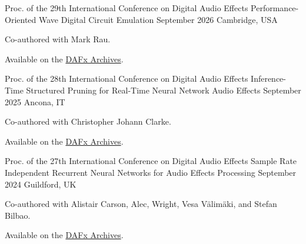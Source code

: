 

\begin{cventries}

  \cventry
    {Proc. of the 29th International Conference on Digital Audio Effects} %
    {Performance-Oriented Wave Digital Circuit Emulation} %
    {September 2026} %
    {Cambridge, USA} %
    {
      \begin{cvitems} %
        \item {Co-authored with Mark Rau.}
        \item {Available on the \href{https://dafx26.mit.edu/assets/papers/DAFx26_paper_23.pdf}{DAFx Archives}.}
      \end{cvitems}
    }

  \cventry
    {Proc. of the 28th International Conference on Digital Audio Effects} %
    {Inference-Time Structured Pruning for Real-Time Neural Network Audio Effects} %
    {September 2025} %
    {Ancona, IT} %
    {
      \begin{cvitems} %
        \item {Co-authored with Christopher Johann Clarke.}
        \item {Available on the \href{https://dafx25.dii.univpm.it/wp-content/uploads/2025/07/DAFx25_paper_78.pdf}{DAFx Archives}.}
      \end{cvitems}
    }

  \cventry
    {Proc. of the 27th International Conference on Digital Audio Effects} %
    {Sample Rate Independent Recurrent Neural Networks for Audio Effects Processing} %
    {September 2024} %
    {Guildford, UK} %
    {
      \begin{cvitems} %
        \item {Co-authored with Alistair Carson, Alec, Wright, Vesa Välimäki, and Stefan Bilbao.}
        \item {Available on the \href{https://www.dafx.de/paper-archive/2024/papers/DAFx24_paper_68.pdf}{DAFx Archives}.}
      \end{cvitems}
    }


\end{cventries}
